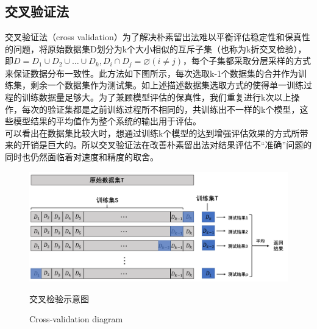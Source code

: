  \subsection{交叉验证法}
 \indent 交叉验证法（cross validation）为了解决朴素留出法难以平衡评估稳定性和保真性的问题，将原始数据集D划分为k个大小相似的互斥子集（也称为k折交叉检验），即$D=D_{1} \cup D_{2} \cup \ldots \cup D_{k}, D_{i} \cap D_{j}=\varnothing(i \neq j)$，每个子集都采取分层采样的方式来保证数据分布一致性。此方法如下图所示，每次选取k-1个数据集的合并作为训练集，剩余一个数据集作为测试集。如上述描述数据集选取方式的使得单一训练过程的训练数据量足够大。为了兼顾模型评估的保真性，我们重复进行k次以上操作，每次的验证集都是之前训练过程所不相同的，共训练出不一样的k个模型，这些模型结果的平均值作为整个系统的输出用于评估。\\
 \indent 可以看出在数据集比较大时，想通过训练k个模型的达到增强评估效果的方式所带来的开销是巨大的。所以交叉验证法在改善朴素留出法对结果评估不“准确”问题的同时也仍然面临着对速度和精度的取舍。\\
\begin{figure}[!h] 
\centering 
\includegraphics[width=0.95\linewidth]{img/cv.jpg} 
\renewcommand{\figurename}{图} 
\caption{交叉检验示意图} 
\addtocounter{figure}{-1} \vspace{-5pt} 
\renewcommand{\figurename}{Fig} 
\caption{Cross-validation diagram} 
\renewcommand{\figurename}{图} 
\label{fig:network-device-influence.png} 
\end{figure}
